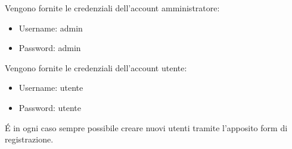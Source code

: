 Vengono fornite le credenziali dell’account amministratore:
\begin{itemize}
    \item Username: admin
    \item Password: admin
\end{itemize}
Vengono fornite le credenziali dell’account utente:
\begin{itemize}
    \item Username: utente
    \item Password: utente
\end{itemize}
É in ogni caso sempre possibile creare nuovi utenti tramite l'apposito form di registrazione.